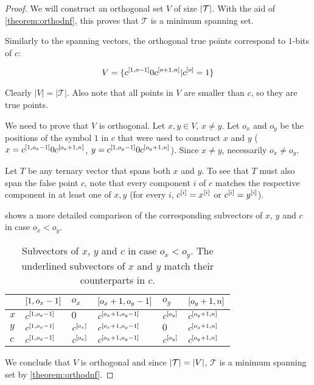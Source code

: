 \begin{proof}
We will construct an orthogonal set $V$
of size $\lvert\mathcal{T}\rvert$.
With the aid of \autoref{theorem:orthodnf},
this proves that $\mathcal{T}$ is a minimum spanning set.

Similarly to the spanning vectors,
the orthogonal true points correspond to $1$-bits of $c$:

\[
V =
\{c^{[1, o - 1]} 0 c^{[o + 1, n]}
| c^{[o]} = 1\}
\]

Clearly $|V| = |\mathcal{T}|$.
Also note that all points in $V$ are smaller than $c$,
so they are true points.

We need to prove that $V$ is orthogonal.
Let $x, y \in V$, $x \neq y$.
Let $o_x$ and $o_y$ be the positions of the symbol $1$
in $c$
that were used to construct $x$ and $y$
($x = c^{[1, o_x - 1]} 0 c^{[o_x + 1, n]}$,
$y = c^{[1, o_y - 1]} 0 c^{[o_y + 1, n]}$).
Since $x \neq y$, necessarily $o_x \neq o_y$.

Let $T$ be any ternary vector that spans both $x$ and $y$.
To see that $T$ must also span the false point $c$,
note that every component $i$ of $c$
matches the respective component in at least one of $x,y$
(for every $i$,
$c^{[i]} = x^{[i]}$ or $c^{[i]} = y^{[i]}$).

shows a more detailed comparison
of the corresponding subvectors of $x$, $y$ and $c$
in case $o_x < o_y$.

\begin{table}[h]
\centering
\begin{tabular}{l|lllll}
& $[1, o_x - 1]$ & $o_x$
& $[o_x + 1, o_y - 1]$ & $o_y$
& $[o_y + 1, n]$ \\
\hline
$x$
& \underline{$c^{[1, o_x - 1]}$}
& $0$
& \underline{$c^{[o_x + 1, o_y - 1]}$}
& \underline{$c^{[o_y]}$}
& \underline{$c^{[o_y + 1, n]}$} \\
$y$
& \underline{$c^{[1, o_x - 1]}$}
& \underline{$c^{[o_x]}$}
& \underline{$c^{[o_x + 1, o_y - 1]}$}
& $0$
& \underline{$c^{[o_y + 1, n]}$} \\
\hline
$c$
& $c^{[1, o_x - 1]}$
& $c^{[o_x]}$
& $c^{[o_x + 1, o_y - 1]}$
& $c^{[o_y]}$
& $c^{[o_y + 1, n]}$
\end{tabular}
\caption[Subvectors of $x$, $y$ and $c$
in case $o_x < o_y$]
{Subvectors of $x$, $y$ and $c$
in case $o_x < o_y$.
The underlined subvectors of $x$ and $y$
match their counterparts in $c$.}
\label{tab:xyc}
\end{table}


We conclude that $V$ is orthogonal
and since $\lvert\mathcal{T}\rvert = \lvert V\rvert$,
$\mathcal{T}$ is a minimum spanning set
by \autoref{theorem:orthodnf}.
\end{proof}

